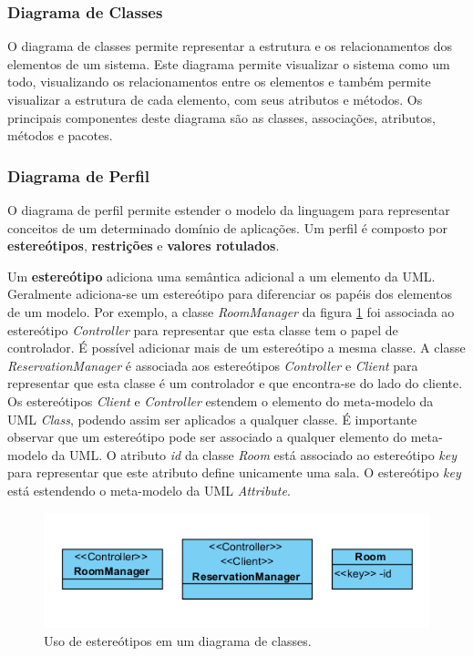 \subsubsection{Diagrama de Classes}

O diagrama de classes permite representar a estrutura e os relacionamentos dos elementos de um sistema. Este diagrama permite visualizar o sistema
como um todo, visualizando os relacionamentos entre os elementos e também permite visualizar a estrutura de cada elemento, com seus atributos e
métodos. Os principais componentes deste diagrama são as classes, associações, atributos, métodos e pacotes.

\subsubsection{Diagrama de Perfil}

O diagrama de perfil permite estender o modelo da linguagem para representar conceitos de um determinado domínio de aplicações. Um perfil é composto
por \textbf{estereótipos}, \textbf{restrições} e \textbf{valores rotulados}. 

Um \textbf{estereótipo} adiciona uma semântica adicional a um elemento da UML. Geralmente adiciona-se um estereótipo para diferenciar os papéis dos
elementos de um modelo. Por exemplo, a classe \textit{RoomManager} da figura \ref{fig:stereotype_1} foi associada ao estereótipo \textit{Controller} 
para representar que esta classe tem o papel de controlador. É possível adicionar mais de um estereótipo a mesma classe. A classe
\textit{ReservationManager} é associada aos estereótipos \textit{Controller} e \textit{Client} para representar que esta classe é
um controlador e que encontra-se do lado do cliente. Os estereótipos \textit{Client} e \textit{Controller} estendem o elemento do 
meta-modelo da UML \textit{Class}, podendo assim ser aplicados a qualquer classe.  É importante observar que um estereótipo pode ser associado a
qualquer elemento do meta-modelo da UML. O atributo \textit{id} da classe \textit{Room} está associado ao estereótipo \textit{key} para representar
que este atributo define unicamente uma sala. O estereótipo \textit{key} está estendendo o meta-modelo da UML \textit{Attribute}.

\begin{figure}
	\centering
	\includegraphics{img/stereotype_1.png}
	\caption{Uso de estereótipos em um diagrama de classes.}\label{fig:stereotype_1}
\end{figure}

